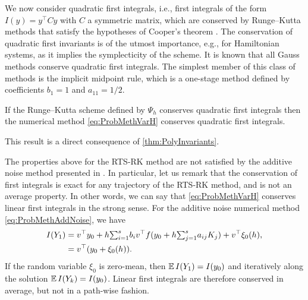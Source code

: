 \documentclass[10pt]{article}
\begin{document}
We now consider quadratic first integrals, i.e., first integrals of the form $I(y) = y^\top C y$ with $C$ a symmetric matrix, which are conserved by Runge--Kutta methods that satisfy the hypotheses of Cooper's theorem \cite[Theorem IV.2.2]{HLW06}. The conservation of quadratic first invariants is of the utmost importance, e.g., for Hamiltonian systems, as it implies the symplecticity of the scheme. It is known \cite[Theorem IV.2.1]{HLW06} that all Gauss methods conserve quadratic first integrals. The simplest member of this class of methods is the implicit midpoint rule, which is a one-stage method defined by coefficients $b_1 = 1$ and $a_{11} = 1/2$.
\begin{corollary}\label{thm:QuadraticInvariants} If the Runge--Kutta scheme defined by $\Psi_h$ conserves quadratic first integrals then the numerical method \eqref{eq:ProbMethVarH} conserves quadratic first integrals.
\end{corollary}
This result is a direct consequence of \cref{thm:PolyInvariants}.

The properties above for the RTS-RK method are not satisfied by the additive noise method presented in \cite{CGS16}. In particular, let us remark that the conservation of first integrals is exact for any trajectory of the RTS-RK method, and is not an average property. In other words, we can say that \eqref{eq:ProbMethVarH} conserves linear first integrals in the strong sense. For the additive noise numerical method \eqref{eq:ProbMethAddNoise}, we have
\begin{equation}
	\begin{aligned}
	I(Y_1) &= v^\top  y_0 + h {\textstyle\sum}_{i=1}^s b_iv^\top  f(y_0 + h{\textstyle\sum}_{j=1}^{s} a_{ij}K_j) + v^\top  \xi_0(h), \\
	&= v^\top  (y_0 + \xi_0(h)).
	\end{aligned}
\end{equation}
If the random variable $\xi_0$ is zero-mean, then $\operatorname{\mathbb{E}} I(Y_1) = I(y_0)$ and iteratively along the solution $\operatorname{\mathbb{E}} I(Y_k) = I(y_0)$. Linear first integrals are therefore conserved in average, but not in a path-wise fashion.
\end{document}
